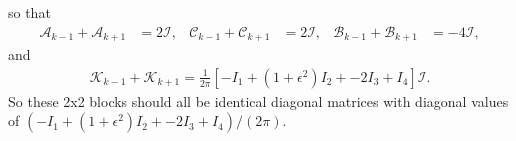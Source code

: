 \documentclass[12pt]{article}
\newcommand{\eps}{\epsilon}
\newcommand{\baas}[1]{\begin{align*} #1 \end{align*}}
\begin{document}
so that
\baas{
\mathcal{A}_{k- 1} + \mathcal{A}_{k+1} & = 2\mathcal{I}, & \mathcal{C}_{k- 1} + \mathcal{C}_{k+1} & =  2\mathcal{I}, & \mathcal{B}_{k- 1} + \mathcal{B}_{k+1} & = - 4\mathcal{I},
}
and 
\baas{
\mathcal{K}_{k-1} + \mathcal{K}_{k+1} = \frac{1}{2\pi}\left[ - I_1 + (1+\eps^2 )I_2 + -2 I_3 + I_4\right]\mathcal{I}.
}
So these 2x2 blocks should all be identical diagonal matrices with diagonal values of $(- I_1 + (1+\eps^2 )I_2 + -2 I_3 + I_4)/(2\pi)$.
\end{document}
